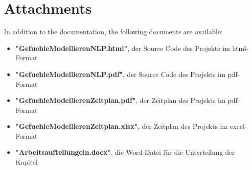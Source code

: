 \section{Attachments}
In addition to the documentation, the following documents are available:
\begin{itemize}
    \item \textbf{"GefuehleModellierenNLP.html"}, der Source Code des Projekts im html-Format
    \item \textbf{"GefuehleModellierenNLP.pdf"}, der Source Code des Projekts im pdf-Format
    \item \textbf{"GefuehleModellierenZeitplan.pdf"}, der Zeitplan des Projekts im pdf-Format
    \item \textbf{"GefuehleModellierenZeitplan.xlsx"}, der Zeitplan des Projekts im excel-Format
    \item \textbf{"Arbeitsaufteilungein.docx"}, die Word-Datei für die Unterteilung der Kapitel
\end{itemize}




